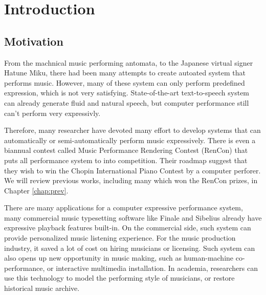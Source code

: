 \chapter{Introduction}
\section{Motivation}
From the machnical music performing antomata, to the Japanese virtual signer Hatune Miku, there had been many attempts to create autoated system that performs music. However, many of these system can only perform predefined expression, which is not very satisfying. State-of-the-art text-to-speech system can already generate fluid and natural speech, but computer performance still can't perform very expressivly.

Therefore, many researcher have devoted many effort to develop systems that can automatically or semi-automatically perform music expressively. There is even a biannual contest called Music Performance Rendering Contest (RenCon)\cite{RenCon} that puts all performance system to into competition. Their roadmap suggest that they wish to win the Chopin International Piano Contest by a computer perforer. We will review previous works, including many which won the RenCon prizes, in Chapter \ref{chap:prev}.


There are many applications for a computer expressive performance system, many commercial music typesetting software like Finale and Sibelius already have expressive playback features built-in. On the commercial side, such system can provide personalized music listening experience. For the music production industry, it saved a lot of cost on hiring musicians or licensing. Such system can also opens up new opportunity in music making, such as human-machine co-performance, or interactive multimedia installation. In academia, researchers can use this technology to model the performing style of musicians, or restore historical music archive.

